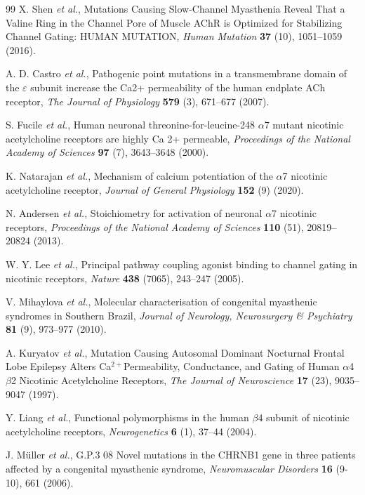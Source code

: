 \documentclass{ws-procs11x85}
\begin{document}
\begin{thebibliography}{99}
X. Shen {\em et al.}, Mutations Causing Slow-Channel Myasthenia Reveal That a Valine Ring in the Channel Pore of Muscle AChR is Optimized for Stabilizing Channel Gating: HUMAN MUTATION, {\em Human Mutation} {\bf 37} (10), 1051--1059 (2016).

A. D. Castro {\em et al.}, Pathogenic point mutations in a transmembrane domain of the $\varepsilon$ subunit increase the Ca2+ permeability of the human endplate ACh receptor, {\em The Journal of Physiology} {\bf 579} (3), 671--677 (2007).

S. Fucile {\em et al.}, Human neuronal threonine-for-leucine-248 $\alpha$7 mutant nicotinic acetylcholine receptors are highly Ca 2+ permeable, {\em Proceedings of the National Academy of Sciences} {\bf 97} (7), 3643--3648 (2000).

K. Natarajan {\em et al.}, Mechanism of calcium potentiation of the $\alpha$7 nicotinic acetylcholine receptor, {\em Journal of General Physiology} {\bf 152} (9) (2020).

N. Andersen {\em et al.}, Stoichiometry for activation of neuronal $\alpha$7 nicotinic receptors, {\em Proceedings of the National Academy of Sciences} {\bf 110} (51), 20819--20824 (2013).

W. Y. Lee {\em et al.}, Principal pathway coupling agonist binding to channel gating in nicotinic receptors, {\em Nature} {\bf 438} (7065), 243--247 (2005).

V. Mihaylova {\em et al.}, Molecular characterisation of congenital myasthenic syndromes in Southern Brazil, {\em Journal of Neurology, Neurosurgery \& Psychiatry} {\bf 81} (9), 973--977 (2010).

A. Kuryatov {\em et al.}, Mutation Causing Autosomal Dominant Nocturnal Frontal Lobe Epilepsy Alters Ca$^{2+}$Permeability, Conductance, and Gating of Human $\alpha$4$\beta$2 Nicotinic Acetylcholine Receptors, {\em The Journal of Neuroscience} {\bf 17} (23), 9035--9047 (1997).

Y. Liang {\em et al.}, Functional polymorphisms in the human $\beta$4 subunit of nicotinic acetylcholine receptors, {\em Neurogenetics} {\bf 6} (1), 37--44 (2004).

J. M{\"u}ller {\em et al.}, G.P.3 08 Novel mutations in the CHRNB1 gene in three patients affected by a congenital myasthenic syndrome, {\em Neuromuscular Disorders} {\bf 16} (9-10), 661 (2006).


\end{thebibliography}
\end{document}
